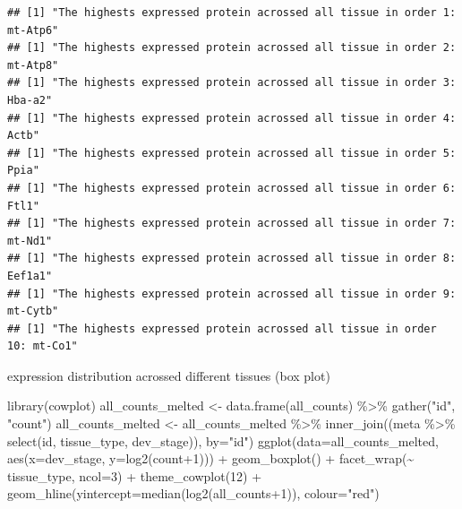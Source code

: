 \documentclass[
]{article}
\newenvironment{Shaded}{\begin{snugshade}}{\end{snugshade}}
\newcommand{\AttributeTok}[1]{\textcolor[rgb]{0.77,0.63,0.00}{#1}}
\newcommand{\DecValTok}[1]{\textcolor[rgb]{0.00,0.00,0.81}{#1}}
\newcommand{\FunctionTok}[1]{\textcolor[rgb]{0.00,0.00,0.00}{#1}}
\newcommand{\NormalTok}[1]{#1}
\newcommand{\OtherTok}[1]{\textcolor[rgb]{0.56,0.35,0.01}{#1}}
\newcommand{\SpecialCharTok}[1]{\textcolor[rgb]{0.00,0.00,0.00}{#1}}
\newcommand{\StringTok}[1]{\textcolor[rgb]{0.31,0.60,0.02}{#1}}
\begin{document}
\begin{verbatim}
## [1] "The highests expressed protein acrossed all tissue in order 1: mt-Atp6"
## [1] "The highests expressed protein acrossed all tissue in order 2: mt-Atp8"
## [1] "The highests expressed protein acrossed all tissue in order 3: Hba-a2"
## [1] "The highests expressed protein acrossed all tissue in order 4: Actb"
## [1] "The highests expressed protein acrossed all tissue in order 5: Ppia"
## [1] "The highests expressed protein acrossed all tissue in order 6: Ftl1"
## [1] "The highests expressed protein acrossed all tissue in order 7: mt-Nd1"
## [1] "The highests expressed protein acrossed all tissue in order 8: Eef1a1"
## [1] "The highests expressed protein acrossed all tissue in order 9: mt-Cytb"
## [1] "The highests expressed protein acrossed all tissue in order 10: mt-Co1"
\end{verbatim}

expression distribution acrossed different tissues (box plot)

\begin{Shaded}
\begin{Highlighting}[]
\FunctionTok{library}\NormalTok{(cowplot)}
\NormalTok{all\_counts\_melted }\OtherTok{\textless{}{-}} \FunctionTok{data.frame}\NormalTok{(all\_counts) }\SpecialCharTok{\%\textgreater{}\%} \FunctionTok{gather}\NormalTok{(}\StringTok{"id"}\NormalTok{, }\StringTok{"count"}\NormalTok{)}
\NormalTok{all\_counts\_melted }\OtherTok{\textless{}{-}}\NormalTok{ all\_counts\_melted }\SpecialCharTok{\%\textgreater{}\%} \FunctionTok{inner\_join}\NormalTok{((meta }\SpecialCharTok{\%\textgreater{}\%} \FunctionTok{select}\NormalTok{(id, tissue\_type, dev\_stage)), }\AttributeTok{by=}\StringTok{"id"}\NormalTok{)}
  \FunctionTok{ggplot}\NormalTok{(}\AttributeTok{data=}\NormalTok{all\_counts\_melted, }\FunctionTok{aes}\NormalTok{(}\AttributeTok{x=}\NormalTok{dev\_stage, }\AttributeTok{y=}\FunctionTok{log2}\NormalTok{(count}\SpecialCharTok{+}\DecValTok{1}\NormalTok{))) }\SpecialCharTok{+} \FunctionTok{geom\_boxplot}\NormalTok{() }\SpecialCharTok{+}  \FunctionTok{facet\_wrap}\NormalTok{(}\SpecialCharTok{\textasciitilde{}}\NormalTok{ tissue\_type, }\AttributeTok{ncol=}\DecValTok{3}\NormalTok{) }\SpecialCharTok{+} \FunctionTok{theme\_cowplot}\NormalTok{(}\DecValTok{12}\NormalTok{) }\SpecialCharTok{+} \FunctionTok{geom\_hline}\NormalTok{(}\AttributeTok{yintercept=}\FunctionTok{median}\NormalTok{(}\FunctionTok{log2}\NormalTok{(all\_counts}\SpecialCharTok{+}\DecValTok{1}\NormalTok{)), }\AttributeTok{colour=}\StringTok{"red"}\NormalTok{)}
\end{Highlighting}
\end{Shaded}
\end{document}
